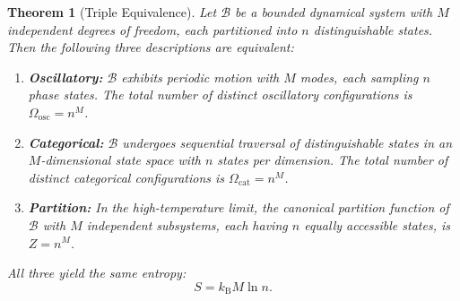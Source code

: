 \documentclass[11pt,twocolumn,a4paper]{article}
\newtheorem{theorem}{Theorem}[section]
\theoremstyle{definition}
\theoremstyle{remark}
\newcommand{\kB}{k_{\mathrm{B}}}
\begin{document}
\begin{theorem}[Triple Equivalence]\label{thm:triple}
Let $\mathcal{B}$ be a bounded dynamical system with $M$ independent degrees of freedom, each partitioned into $n$ distinguishable states. Then the following three descriptions are equivalent:

\begin{enumerate}[label=(\arabic*)]
  \item \textbf{Oscillatory:} $\mathcal{B}$ exhibits periodic motion with $M$ modes, each sampling $n$ phase states. The total number of distinct oscillatory configurations is $\Omega_{\mathrm{osc}} = n^M$.

  \item \textbf{Categorical:} $\mathcal{B}$ undergoes sequential traversal of distinguishable states in an $M$-dimensional state space with $n$ states per dimension. The total number of distinct categorical configurations is $\Omega_{\mathrm{cat}} = n^M$.

  \item \textbf{Partition:} In the high-temperature limit, the canonical partition function of $\mathcal{B}$ with $M$ independent subsystems, each having $n$ equally accessible states, is $Z = n^M$.
\end{enumerate}

All three yield the same entropy:
\begin{equation}\label{eq:triple-entropy}
  S = \kB M \ln n.
\end{equation}
\end{theorem}
\end{document}

